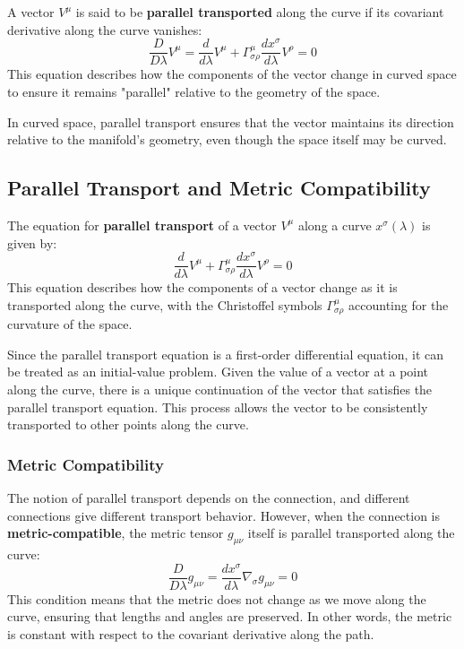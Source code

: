 \documentclass[12pt]{book}
\begin{document}
A vector \( V^\mu \) is said to be \textbf{parallel transported} along the curve if its covariant derivative along the curve vanishes:
\[
\frac{D}{D\lambda} V^\mu = \frac{d}{d\lambda} V^\mu + \Gamma^\mu_{\sigma\rho} \frac{dx^\sigma}{d\lambda} V^\rho = 0
\]
This equation describes how the components of the vector change in curved space to ensure it remains "parallel" relative to the geometry of the space.

In curved space, parallel transport ensures that the vector maintains its direction relative to the manifold's geometry, even though the space itself may be curved.

\subsection{Parallel Transport and Metric Compatibility}

The equation for \textbf{parallel transport} of a vector \( V^\mu \) along a curve \( x^\sigma(\lambda) \) is given by:
\[
\frac{d}{d\lambda} V^\mu + \Gamma^\mu_{\sigma\rho} \frac{dx^\sigma}{d\lambda} V^\rho = 0
\]
This equation describes how the components of a vector change as it is transported along the curve, with the Christoffel symbols \( \Gamma^\mu_{\sigma\rho} \) accounting for the curvature of the space.

Since the parallel transport equation is a first-order differential equation, it can be treated as an initial-value problem. Given the value of a vector at a point along the curve, there is a unique continuation of the vector that satisfies the parallel transport equation. This process allows the vector to be consistently transported to other points along the curve.

\subsubsection{Metric Compatibility}
The notion of parallel transport depends on the connection, and different connections give different transport behavior. However, when the connection is \textbf{metric-compatible}, the metric tensor \( g_{\mu\nu} \) itself is parallel transported along the curve:
\[
\frac{D}{D\lambda} g_{\mu\nu} = \frac{dx^\sigma}{d\lambda} \nabla_\sigma g_{\mu\nu} = 0
\]
This condition means that the metric does not change as we move along the curve, ensuring that lengths and angles are preserved. In other words, the metric is constant with respect to the covariant derivative along the path.
\end{document}
